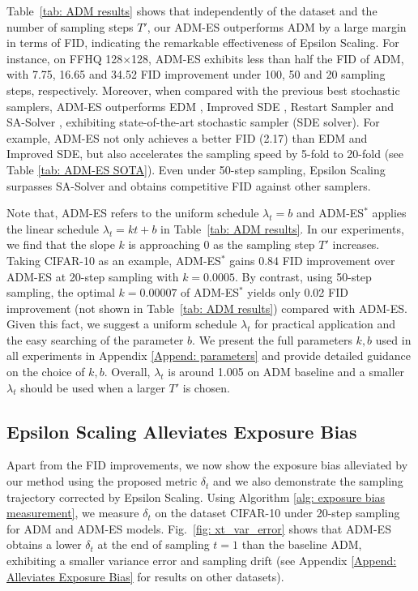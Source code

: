 \documentclass{article} \usepackage{iclr2024_conference,times}
\begin{document}
Table~\ref{tab: ADM results} shows that independently of the dataset and the number of sampling steps $T'$, our ADM-ES outperforms ADM by a large margin in terms of FID, indicating the remarkable effectiveness of Epsilon Scaling. For instance, on FFHQ 128$\times$128, ADM-ES exhibits less than half the FID of ADM, with 7.75, 16.65 and 34.52 FID improvement under 100, 50 and 20 sampling steps, respectively. Moreover, when compared with the previous best stochastic samplers, ADM-ES outperforms EDM \citep{karras2022elucidating}, Improved SDE \citep{karras2022elucidating}, Restart Sampler \citep{xu2023restart} and SA-Solver \citep{xue2023sa}, exhibiting state-of-the-art stochastic sampler (SDE solver). For example, ADM-ES not only achieves a better FID (2.17) than EDM and Improved SDE, but also accelerates the sampling speed by 5-fold to 20-fold (see Table \ref{tab: ADM-ES SOTA}). Even under 50-step sampling, Epsilon Scaling surpasses SA-Solver and obtains competitive FID against other samplers. 


Note that, ADM-ES refers to the uniform schedule $\lambda_t=b$ and ADM-ES$^*$ applies the linear schedule $\lambda_t=kt+b$ in Table~\ref{tab: ADM results}. In our experiments, we find that the slope $k$ is approaching 0 as the sampling step $T'$ increases. Taking CIFAR-10 as an example, ADM-ES$^*$ gains 0.84 FID improvement over ADM-ES at 20-step sampling with $k=0.0005$. By contrast, using 50-step sampling, the optimal $k=0.00007$ of ADM-ES$^*$ yields only 0.02 FID improvement (not shown in Table~\ref{tab: ADM results}) compared with ADM-ES. Given this fact, we suggest a uniform schedule $\lambda_t$ for practical application and the easy searching of the parameter $b$. We present the full parameters $k,b$ used in all experiments in Appendix \ref{Append: parameters} and provide detailed guidance on the choice of $k, b$. Overall, $\lambda_t$ is around 1.005 on ADM baseline and a smaller $\lambda_t$ should be used when a larger $T'$ is chosen. 


\subsection{Epsilon Scaling Alleviates Exposure Bias}
\label{sec: alleviate exposure bias}
Apart from the FID improvements, we now show the exposure bias alleviated by our method using the proposed metric $\delta_t$ and we also demonstrate the sampling trajectory corrected by Epsilon Scaling. Using Algorithm \ref{alg: exposure bias measurement}, we measure $\delta_t$ on the dataset CIFAR-10 under 20-step sampling for ADM and ADM-ES models. Fig.~\ref{fig: xt_var_error} shows that ADM-ES obtains a lower $\delta_t$ at the end of sampling $t=1$ than the baseline ADM, exhibiting a smaller variance error and sampling drift (see Appendix \ref{Append: Alleviates Exposure Bias} for results on other datasets). 
\end{document}
